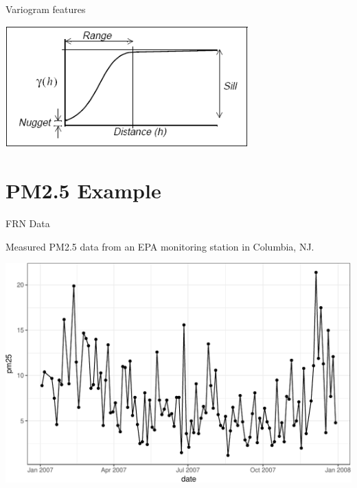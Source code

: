 \documentclass[11pt,ignorenonframetext,]{beamer}
\begin{document}
\begin{frame}{%
\protect\hypertarget{variogram-features}{%
Variogram features}}

\begin{center}
\includegraphics[width=0.7\textwidth]{figs/variogram.png}
\end{center}

\end{frame}

\hypertarget{pm2.5-example}{%
\section{PM2.5 Example}\label{pm2.5-example}}

\begin{frame}{%
\protect\hypertarget{frn-data}{%
FRN Data}}

Measured PM2.5 data from an EPA monitoring station in Columbia, NJ.

\begin{center}\includegraphics[width=\textwidth]{Lec13_files/figure-beamer/unnamed-chunk-9-1} \end{center}

\end{frame}
\end{document}

